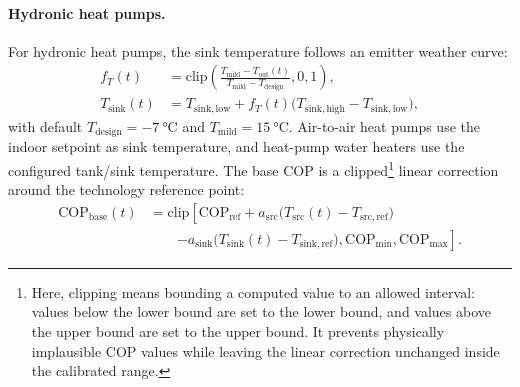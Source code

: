 \paragraph{Hydronic heat pumps.}
For hydronic heat pumps, the sink temperature follows an emitter weather curve:
\begin{equation}
\begin{aligned}
  f_T(t)
  &= \mathrm{clip}\!\left(
      \frac{T_{\mathrm{mild}} - T_{\mathrm{out}}(t)}
           {T_{\mathrm{mild}} - T_{\mathrm{design}}},
      0, 1
    \right),\\
  T_{\mathrm{sink}}(t)
  &= T_{\mathrm{sink,low}}
    + f_T(t)\bigl(T_{\mathrm{sink,high}} - T_{\mathrm{sink,low}}\bigr),
\end{aligned}
  \label{eq:hp_sink_weather_curve}
\end{equation}
with default $T_{\mathrm{design}}=-\SI{7}{\celsius}$ and $T_{\mathrm{mild}}=\SI{15}{\celsius}$. Air-to-air heat pumps use the indoor setpoint as sink temperature, and heat-pump water heaters use the configured tank/sink temperature.
The base COP is a clipped\footnote{Here, clipping means bounding a computed value to an allowed interval: values below the lower bound are set to the lower bound, and values above the upper bound are set to the upper bound. It prevents physically implausible COP values while leaving the linear correction unchanged inside the calibrated range.} linear correction around the technology reference point:
\begin{equation}
\begin{aligned}
  \mathrm{COP}_{\mathrm{base}}(t)
  &= \mathrm{clip}\!\left[
      \mathrm{COP}_{\mathrm{ref}}
      + a_{\mathrm{src}}\bigl(T_{\mathrm{src}}(t)-T_{\mathrm{src,ref}}\bigr)
      \right.\\
  &\qquad \left.
      - a_{\mathrm{sink}}\bigl(T_{\mathrm{sink}}(t)-T_{\mathrm{sink,ref}}\bigr),
      \mathrm{COP}_{\min}, \mathrm{COP}_{\max}
    \right].
\end{aligned}
  \label{eq:hp_cop_base}
\end{equation}

